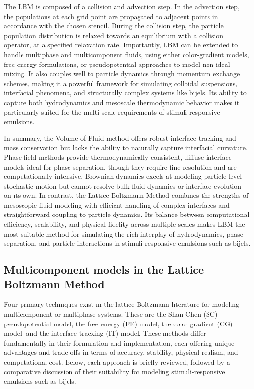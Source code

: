 The LBM is composed of a collision and advection step. In the advection step, the populations at each grid point are propagated to adjacent points in accordance 
with the chosen stencil. During the collision step, the particle population distribution is relaxed towards an equilibrium with a collision operator, at a 
specified relaxation rate. Importantly, LBM can be extended to handle multiphase and multicomponent fluids, using either color-gradient models, free energy formulations, 
or pseudopotential approaches to model non-ideal mixing. It also couples well to particle dynamics through momentum exchange schemes, making it a powerful framework for 
simulating colloidal suspensions, interfacial phenomena, and structurally complex systems like bijels. Its ability to capture both hydrodynamics and mesoscale thermodynamic 
behavior makes it particularly suited for the multi-scale requirements of stimuli-responsive emulsions.

In summary, the Volume of Fluid method offers robust interface tracking and mass conservation but lacks the ability to naturally capture interfacial curvature. 
Phase field methods provide thermodynamically consistent, diffuse-interface models ideal for phase separation, though they require fine resolution and are computationally intensive. 
Brownian dynamics excels at modeling particle-level stochastic motion but cannot resolve bulk fluid dynamics or interface evolution on its own. In contrast, the Lattice Boltzmann Method 
combines the strengths of mesoscopic fluid modeling with efficient handling of complex interfaces and straightforward coupling to particle dynamics. Its balance between computational 
efficiency, scalability, and physical fidelity across multiple scales makes LBM the most suitable method for simulating the rich interplay of hydrodynamics, phase separation, and particle 
interactions in stimuli-responsive emulsions such as bijels.

\subsection{Multicomponent models in the Lattice Boltzmann Method}

Four primary techniques exist in the lattice Boltzmann literature for modeling multicomponent or multiphase systems. These are the Shan-Chen (SC) 
pseudopotential model, the free energy (FE) model, the color gradient (CG) model, and the interface tracking (IT) model.
These methods differ fundamentally in their formulation and implementation, each offering unique advantages and trade-offs in terms of accuracy, 
stability, physical realism, and computational cost. Below, each approach is briefly reviewed, followed by a comparative discussion of their 
suitability for modeling stimuli-responsive emulsions such as bijels.

